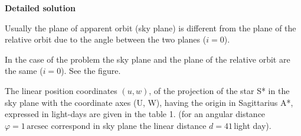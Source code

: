 \textbf{Detailed solution}

Usually the plane of apparent orbit (sky plane) is different from the plane of
the relative orbit due to the angle between the two planes ($i = 0$). %

In the case of the problem the sky plane and the plane of the relative orbit
are the same ($i = 0$). See the figure.

The linear position coordinates $(u, w)$, of the projection of the star S* in
the sky plane with the coordinate axes (U, W), having the origin in
Sagittarius A*, expressed in light-days are given in the table 1. (for an
angular distance $\varphi = 1\,\mathrm{arcsec}$ correspond in sky plane the
linear distance $d = 41$\,light day).

